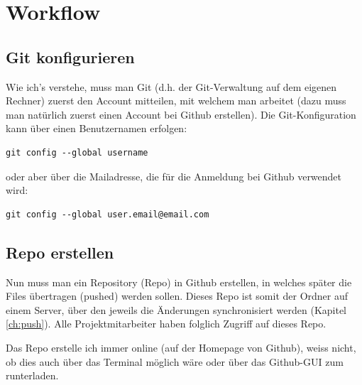 \documentclass[twoside, 11pr]{article}
\begin{document}
\section{Workflow}

\subsection{Git konfigurieren}

Wie ich's verstehe, muss man Git (d.h. der Git-Verwaltung auf dem eigenen Rechner) zuerst den Account mitteilen, mit welchem man arbeitet (dazu muss man natürlich zuerst einen Account bei Github erstellen). Die Git-Konfiguration kann über einen Benutzernamen erfolgen:

\begin{lstlisting}
git config --global username
\end{lstlisting}

\noindent
oder aber über die Mailadresse, die für die Anmeldung bei Github verwendet wird:

\begin{lstlisting}
git config --global user.email@email.com
\end{lstlisting}


\subsection{Repo erstellen}

Nun muss man ein Repository (Repo) in Github erstellen, in welches später die Files übertragen (pushed) werden sollen. Dieses Repo ist somit der Ordner auf einem Server, über den jeweils die Änderungen synchronisiert werden (Kapitel \ref{ch:push}). Alle Projektmitarbeiter haben folglich Zugriff auf dieses Repo. \par
Das Repo erstelle ich immer online (auf der Homepage von Github), weiss nicht, ob dies auch über das Terminal möglich wäre oder über das Github-GUI zum runterladen.
\end{document}
